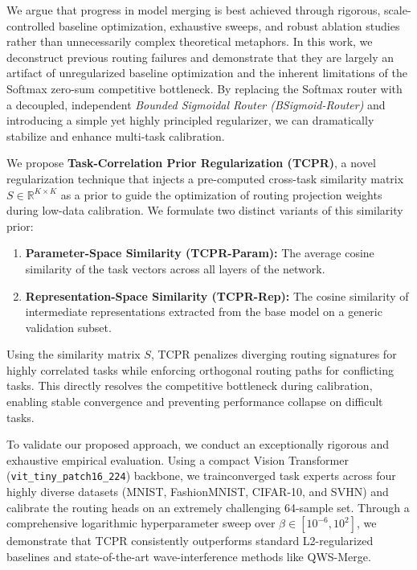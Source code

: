 We argue that progress in model merging is best achieved through rigorous, scale-controlled baseline optimization, exhaustive sweeps, and robust ablation studies rather than unnecessarily complex theoretical metaphors. In this work, we deconstruct previous routing failures and demonstrate that they are largely an artifact of unregularized baseline optimization and the inherent limitations of the Softmax zero-sum competitive bottleneck. By replacing the Softmax router with a decoupled, independent \emph{Bounded Sigmoidal Router (BSigmoid-Router)} and introducing a simple yet highly principled regularizer, we can dramatically stabilize and enhance multi-task calibration.

We propose \textbf{Task-Correlation Prior Regularization (TCPR)}, a novel regularization technique that injects a pre-computed cross-task similarity matrix $S \in \mathbb{R}^{K \times K}$ as a prior to guide the optimization of routing projection weights during low-data calibration. We formulate two distinct variants of this similarity prior:
\begin{enumerate}
    \item \textbf{Parameter-Space Similarity (TCPR-Param):} The average cosine similarity of the task vectors across all layers of the network.
    \item \textbf{Representation-Space Similarity (TCPR-Rep):} The cosine similarity of intermediate representations extracted from the base model on a generic validation subset.
\end{enumerate}
Using the similarity matrix $S$, TCPR penalizes diverging routing signatures for highly correlated tasks while enforcing orthogonal routing paths for conflicting tasks. This directly resolves the competitive bottleneck during calibration, enabling stable convergence and preventing performance collapse on difficult tasks.

To validate our proposed approach, we conduct an exceptionally rigorous and exhaustive empirical evaluation. Using a compact Vision Transformer (\texttt{vit\_tiny\_patch16\_224}) backbone, we trainconverged task experts across four highly diverse datasets (MNIST, FashionMNIST, CIFAR-10, and SVHN) and calibrate the routing heads on an extremely challenging 64-sample set. Through a comprehensive logarithmic hyperparameter sweep over $\beta \in [10^{-6}, 10^2]$, we demonstrate that TCPR consistently outperforms standard L2-regularized baselines and state-of-the-art wave-interference methods like QWS-Merge. 

